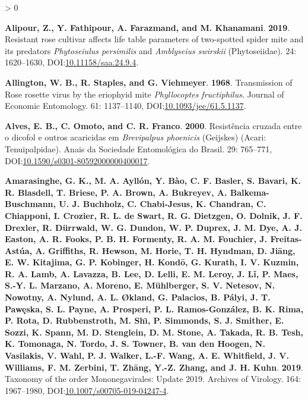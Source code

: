 \documentclass{ufdissertation}[overrideChapters] %
\newlength{\cslhangindent}
\newenvironment{CSLReferences}[2] %
 {%
  \setlength{\parindent}{0pt}
  \ifodd #1 \everypar{\setlength{\hangindent}{\cslhangindent}}\ignorespaces\fi
  \ifnum #2 > 0
  \setlength{\parskip}{#2\baselineskip}
  \fi
 }%
 {}
\begin{document}
{\begin{CSLReferences}{1}{1}
\leavevmode{}%
\textbf{Alipour, Z., Y. Fathipour, A. Farazmand, and M. Khanamani}. \textbf{2019}. Resistant rose cultivar affects life table parameters of two-spotted spider mite and its predators {\emph{Phytoseiulus persimilis}} and {\emph{Amblyseius swirskii}} ({Phytoseiidae}). 24: 1620--1630, DOI:\href{https://doi.org/10.11158/saa.24.9.4}{10.11158/saa.24.9.4}.

\leavevmode{}%
\textbf{Allington, W. B., R. Staples, and G. Viehmeyer}. \textbf{1968}. Transmission of {Rose rosette virus} by the eriophyid mite {\emph{Phyllocoptes fructiphilus}}. Journal of Economic Entomology. 61: 1137--1140, DOI:\href{https://doi.org/10.1093/jee/61.5.1137}{10.1093/jee/61.5.1137}.

\leavevmode{}%
\textbf{Alves, E. B., C. Omoto, and C. R. Franco}. \textbf{2000}. Resist{ê}ncia cruzada entre o dicofol e outros acaricidas em {\emph{Brevipalpus phoenicis}} ({Geijskes}) ({Acari}: {Tenuipalpidae}). Anais da Sociedade Entomol{ó}gica do Brasil. 29: 765--771, DOI:\href{https://doi.org/10.1590/s0301-80592000000400017}{10.1590/s0301-80592000000400017}.

\leavevmode{}%
\textbf{Amarasinghe, G. K., M. A. Ayllón, Y. Bào, C. F. Basler, S. Bavari, K. R. Blasdell, T. Briese, P. A. Brown, A. Bukreyev, A. Balkema-Buschmann, U. J. Buchholz, C. Chabi-Jesus, K. Chandran, C. Chiapponi, I. Crozier, R. L. de Swart, R. G. Dietzgen, O. Dolnik, J. F. Drexler, R. Dürrwald, W. G. Dundon, W. P. Duprex, J. M. Dye, A. J. Easton, A. R. Fooks, P. B. H. Formenty, R. A. M. Fouchier, J. Freitas-Astúa, A. Griffiths, R. Hewson, M. Horie, T. H. Hyndman, D. Jiāng, E. W. Kitajima, G. P. Kobinger, H. Kondō, G. Kurath, I. V. Kuzmin, R. A. Lamb, A. Lavazza, B. Lee, D. Lelli, E. M. Leroy, J. Lǐ, P. Maes, S.-Y. L. Marzano, A. Moreno, E. Mühlberger, S. V. Netesov, N. Nowotny, A. Nylund, A. L. Økland, G. Palacios, B. Pályi, J. T. Pawęska, S. L. Payne, A. Prosperi, P. L. Ramos-González, B. K. Rima, P. Rota, D. Rubbenstroth, M. Shı̄, P. Simmonds, S. J. Smither, E. Sozzi, K. Spann, M. D. Stenglein, D. M. Stone, A. Takada, R. B. Tesh, K. Tomonaga, N. Tordo, J. S. Towner, B. van den Hoogen, N. Vasilakis, V. Wahl, P. J. Walker, L.-F. Wang, A. E. Whitfield, J. V. Williams, F. M. Zerbini, T. Zhāng, Y.-Z. Zhang, and J. H. Kuhn}. \textbf{2019}. Taxonomy of the order {Mononegavirales}: Update 2019. Archives of Virology. 164: 1967--1980, DOI:\href{https://doi.org/10.1007/s00705-019-04247-4}{10.1007/s00705-019-04247-4}.


\end{CSLReferences}}
\end{document}
